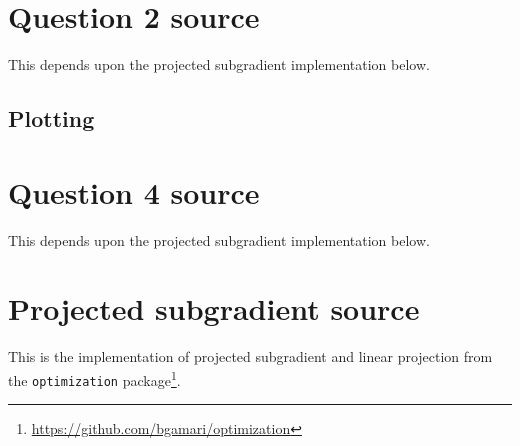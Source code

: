 \documentclass{article}
\begin{document}
\section{Question 2 source}\label{Q2Source}
This depends upon the projected subgradient implementation below.

\subsection{Plotting}


\section{Question 4 source}\label{Q4Source}
This depends upon the projected subgradient implementation below.


\section{Projected subgradient source}\label{ProjSubgradSource}
This is the implementation of projected subgradient and linear
projection from the {\tt optimization}
package\footnote{\url{https://github.com/bgamari/optimization}}.


\end{document}
